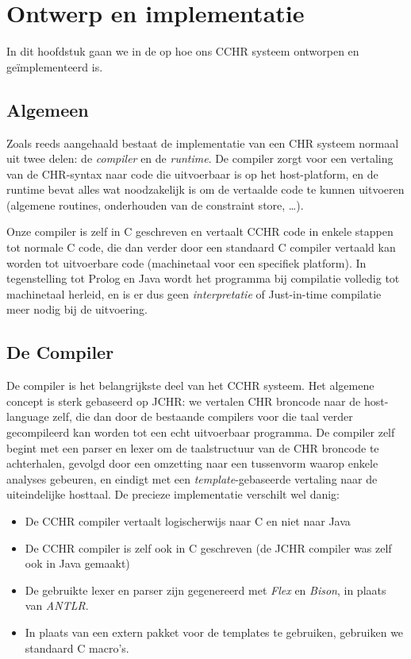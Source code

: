 \chapter{Ontwerp en implementatie} \label{chap:impl}

In dit hoofdstuk gaan we in de op hoe ons CCHR systeem ontworpen en ge\"implementeerd is.

\section{Algemeen} \label{sec:impl-gen}

Zoals reeds aangehaald bestaat de implementatie van een CHR systeem normaal uit twee delen: de {\em compiler} en de {\em runtime}. De compiler zorgt voor een vertaling van de CHR-syntax naar code die uitvoerbaar is op het host-platform, en de runtime bevat alles wat noodzakelijk is om de vertaalde code te kunnen uitvoeren (algemene routines, onderhouden van de constraint store, \ldots).

Onze compiler is zelf in C geschreven en vertaalt CCHR code in enkele stappen tot normale C code, die dan verder door een standaard C compiler vertaald kan worden tot uitvoerbare code (machinetaal voor een specifiek platform). In tegenstelling tot Prolog en Java wordt het programma bij compilatie volledig tot machinetaal herleid, en is er dus geen {\em interpretatie} of {Just-in-time compilatie} meer nodig bij de uitvoering.

\section{De Compiler} \label{sec:impl-comp}

De compiler is het belangrijkste deel van het CCHR systeem. Het algemene concept is sterk gebaseerd op JCHR: we vertalen CHR broncode naar de host-language zelf, die dan door de bestaande compilers voor die taal verder gecompileerd kan worden tot een echt
uitvoerbaar programma. De compiler zelf begint met een parser en lexer om de taalstructuur van de CHR broncode te achterhalen, gevolgd door een omzetting naar een tussenvorm waarop enkele analyses gebeuren, en eindigt met een {\em template}-gebaseerde vertaling naar de uiteindelijke hosttaal. De precieze implementatie verschilt wel danig: \begin{itemize}
  \item De CCHR compiler vertaalt logischerwijs naar C en niet naar Java
  \item De CCHR compiler is zelf ook in C geschreven (de JCHR compiler was zelf ook in Java gemaakt)
  \item De gebruikte lexer en parser zijn gegenereerd met {\em Flex} en {\em Bison}, in plaats van {\em ANTLR}.
  \item In plaats van een extern pakket voor de templates te gebruiken, gebruiken we standaard C macro's.
 \end{itemize}
 
